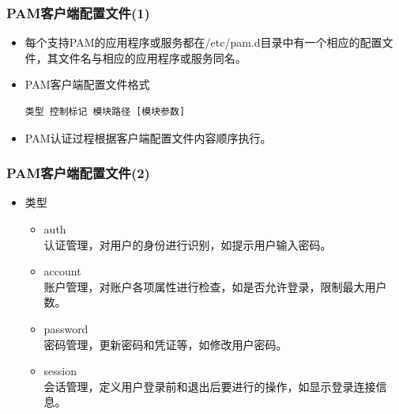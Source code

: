 \documentclass[xcolor=svgnames,presentation]{beamer}
\begin{document}
\begin{frame}[fragile]
\frametitle{PAM客户端配置文件(1)}
\label{sec-6-5}
\begin{itemize}

\item 每个支持PAM的应用程序或服务都在/etc/pam.d目录中有一个相应的配置文件，其文件名与相应的应用程序或服务同名。
\label{sec-6-5-1}%

\item PAM客户端配置文件格式\\
\label{sec-6-5-2}%
\begin{verbatim}
类型 控制标记 模块路径 [模块参数]
\end{verbatim}

\item PAM认证过程根据客户端配置文件内容顺序执行。
\label{sec-6-5-3}%
\end{itemize} %
\end{frame}
\begin{frame}
\frametitle{PAM客户端配置文件(2)}
\label{sec-6-6}
\begin{itemize}

\item 类型
\label{sec-6-6-1}%
\begin{itemize}

\item auth\\
\label{sec-6-6-1-1}%
认证管理，对用户的身份进行识别，如提示用户输入密码。

\item account\\
\label{sec-6-6-1-2}%
账户管理，对账户各项属性进行检查，如是否允许登录，限制最大用户数。

\item password\\
\label{sec-6-6-1-3}%
密码管理，更新密码和凭证等，如修改用户密码。

\item session\\
\label{sec-6-6-1-4}%
会话管理，定义用户登录前和退出后要进行的操作，如显示登录连接信息。
\end{itemize} %
\end{itemize} %
\end{frame}
\end{document}

